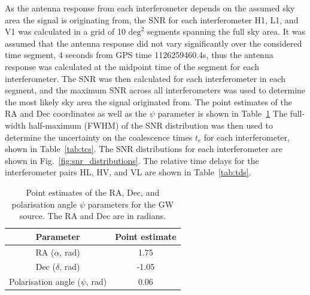 \documentclass[11pt,a4paper]{article}
\begin{document}
As the antenna response from each interferometer depends on the assumed sky area the signal is originating from, the SNR for each interferometer H1, L1, and V1 was calculated in a grid of 10 $\mathrm{deg}^2$ segments spanning the full sky area. It was assumed that the antenna response did not vary significantly over the considered time segment, 4 seconds from GPS time 1126259460.4s, thus the antenna response was calculated at the midpoint time of the segment for each interferometer. The SNR was then calculated for each interferometer in each segment, and the maximum SNR across all interferometers was used to determine the most likely sky area the signal originated from. The point estimates of the RA and Dec coordinates as well as the $\psi$ parameter is shown in Table~\ref{tab:point_estimate} The full-width half-maximum (FWHM) of the SNR distribution was then used to determine the uncertainty on the coalescence times $t_c$ for each interferometer, shown in Table~\ref{tab:tcs}. The SNR distributions for each interferometer are shown in Fig.~\ref{fig:snr_distributions}. The relative time delays for the interferometer pairs HL, HV, and VL are shown in Table~\ref{tab:tds}.

\begin{table}[h]
    \centering
    \begin{tabular}{c|c}
    Parameter & Point estimate \\
    \hline
    RA ($\alpha$, rad) & 1.75 \\
    Dec ($\delta$, rad) & -1.05 \\
    Polarisation angle ($\psi$, rad) & 0.06 \\
    \end{tabular}
    \caption{Point estimates of the RA, Dec, and polarisation angle $\psi$ parameters for the GW source. The RA and Dec are in radians.}
    \label{tab:point_estimate}
\end{table}
\end{document}
